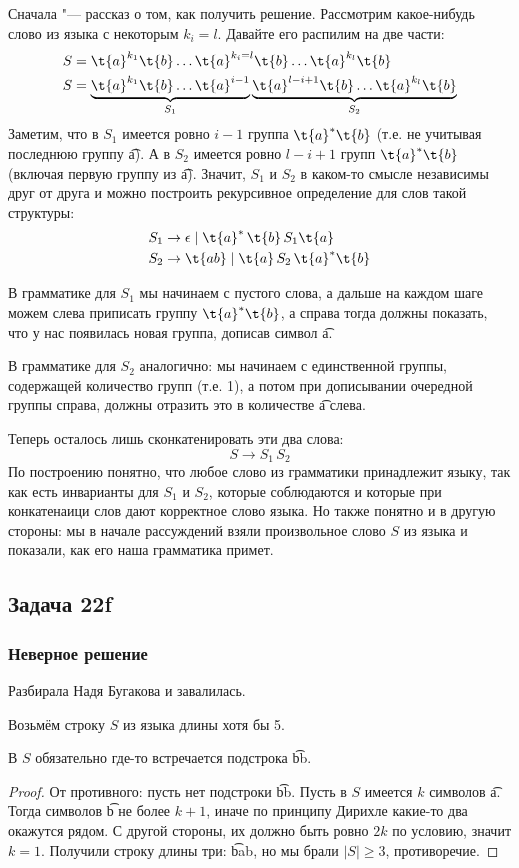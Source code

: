 	Сначала "--- рассказ о том, как получить решение.
	Рассмотрим какое-нибудь слово из языка с некоторым $k_i=l$.
	Давайте его распилим на две части:
	\begin{align*}
		S &= \t{a}^{k_1}\t{b}\dots \t{a}^{k_i=l} \t{b} \dots \t{a}^{k_l} \t{b} \\
		S &= \underbrace{\t{a}^{k_1}\t{b}\dots \t{a}^{i-1}}_{S_1} \underbrace{\t{a}^{l-i+1} \t{b} \dots \t{a}^{k_l} \t{b}}_{S_2}
	\end{align*}
	Заметим, что в $S_1$ имеется ровно $i-1$ группа $\t{a}^*\t{b}$ (т.е. не учитывая последнюю группу \t{a}).
	А в $S_2$ имеется ровно $l-i+1$ групп $\t{a}^*\t{b}$ (включая первую группу из \t{a}).
	Значит, $S_1$ и $S_2$ в каком-то смысле независимы друг от друга и можно построить рекурсивное определение для слов такой структуры:
	\begin{align*}
		S_1 &\to \epsilon \mid \t{a}^*\,\t{b}\,S_1\t{a} \\
		S_2 &\to \t{ab} \mid \t{a}\,S_2\,\t{a}^*\t{b}
	\end{align*}

	В грамматике для $S_1$ мы начинаем с пустого слова, а дальше на каждом шаге можем слева приписать группу $\t{a}^*\t{b}$, а справа тогда
	должны показать, что у нас появилась новая группа, дописав символ \t{a}.

	В грамматике для $S_2$ аналогично: мы начинаем с единственной группы, содержащей количество групп (т.е. 1), а потом при дописывании очередной группы
	справа, должны отразить это в количестве \t{a} слева.

	Теперь осталось лишь сконкатенировать эти два слова:
	\[
		S \to S_1\, S_2
	\]
	По построению понятно, что любое слово из грамматики принадлежит языку, так как есть инварианты для $S_1$ и $S_2$, которые соблюдаются и которые
	при конкатенаици слов дают корректное слово языка.
	Но также понятно и в другую стороны: мы в начале рассуждений взяли произвольное слово $S$ из языка и показали, как его наша грамматика примет.

\subsection{Задача 22f}
	\subsubsection{Неверное решение}
		Разбирала Надя Бугакова и завалилась.

		Возьмём строку $S$ из языка длины хотя бы 5.
		\begin{lemma}
			В $S$ обязательно где-то встречается подстрока \t{bb}.
		\end{lemma}
		\begin{proof}
			От противного: пусть нет подстроки \t{bb}.
			Пусть в $S$ имеется $k$ символов \t{a}.
			Тогда символов \t{b} не более $k+1$, иначе по принципу Дирихле какие-то два окажутся рядом.
			С другой стороны, их должно быть ровно $2k$ по условию, значит $k=1$.
			Получили строку длины три: \t{bab}, но мы брали $|S|\ge3$, противоречие.
		\end{proof}

